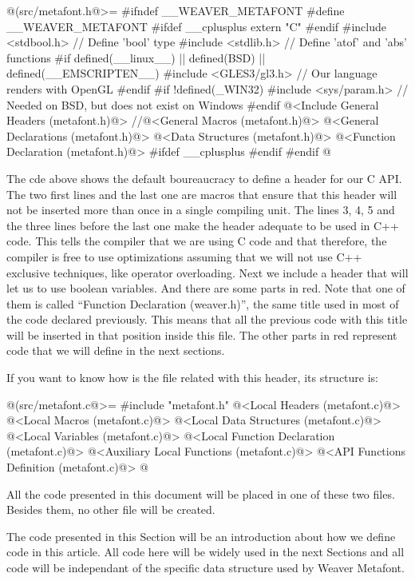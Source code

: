 \iniciocodigo
@(src/metafont.h@>=
#ifndef __WEAVER_METAFONT
#define __WEAVER_METAFONT
#ifdef __cplusplus
extern "C" {
#endif
#include <stdbool.h> // Define  'bool' type
#include <stdlib.h> // Define 'atof' and 'abs' functions
#if defined(__linux__) || defined(BSD) || defined(__EMSCRIPTEN__)
#include <GLES3/gl3.h> // Our language renders with OpenGL
#endif
#if !defined(_WIN32)
#include <sys/param.h> // Needed on BSD, but does not exist on Windows
#endif
@<Include General Headers (metafont.h)@>
//@<General Macros (metafont.h)@>
@<General Declarations (metafont.h)@>
@<Data Structures (metafont.h)@>
@<Function Declaration (metafont.h)@>
#ifdef __cplusplus
}
#endif
#endif
@
\fimcodigo

The cde above shows the default boureaucracy to define a header for
our C API. The two first lines and the last one are macros that ensure
that this header will not be inserted more than once in a single
compiling unit. The lines 3, 4, 5 and the three lines before the last
one make the header adequate to be used in C++ code. This tells the
compiler that we are using C code and that therefore, the compiler is
free to use optimizations assuming that we will not use C++ exclusive
techniques, like operator overloading. Next we include a header that
will let us to use boolean variables. And there are some parts in
red. Note that one of them is called ``Function Declaration
(weaver.h)'', the same title used in most of the code declared
previously. This means that all the previous code with this title will
be inserted in that position inside this file. The other parts in red
represent code that we will define in the next sections.

If you want to know how is the  file related
with this header, its structure is:

\iniciocodigo
@(src/metafont.c@>=
#include "metafont.h"
@<Local Headers (metafont.c)@>
@<Local Macros (metafont.c)@>
@<Local Data Structures (metafont.c)@>
@<Local Variables (metafont.c)@>
@<Local Function Declaration (metafont.c)@>
@<Auxiliary Local Functions (metafont.c)@>
@<API Functions Definition (metafont.c)@>
@
\fimcodigo

All the code presented in this document will be placed in one of these
two files. Besides them, no other file will be created.


The code presented in this Section will be an introduction about how
we define code in this article. All code here will be widely used in
the next Sections and all code will be independant of the specific
data structure used by Weaver Metafont.

